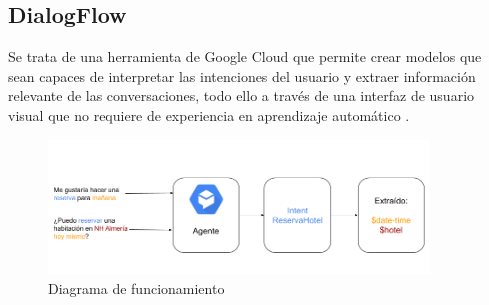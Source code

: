 \subsection{DialogFlow}

Se trata de una herramienta de Google Cloud que permite crear modelos que sean capaces de interpretar las intenciones del usuario y extraer información relevante de las conversaciones, todo ello a través de una interfaz de usuario visual que no requiere de experiencia en aprendizaje automático . 

\begin{figure}[ht]
     \begin{center}
        \includegraphics[width = 0.90\textwidth]{Figuras/IntentsDiagram.png}
     \end{center}
     \caption{\label{fig:IntentsDiagram}Diagrama de funcionamiento}
\end{figure}

\newpage

